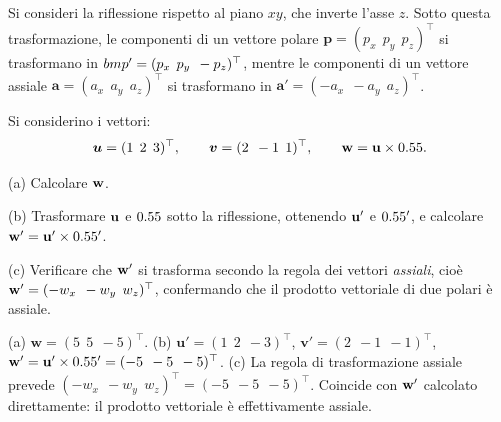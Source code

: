 \begin{esercizio}
	\label{ex:A03_riflessione}
	
	Si consideri la riflessione rispetto al piano $xy$, che inverte l'asse $z$. Sotto questa trasformazione, le componenti di un vettore polare $\bm{p} = (p_x\;\,p_y\;\,p_z)^\top$ si trasformano in $\\bm{p}' = (p_x\;\,p_y\;\,-p_z)^\top$, mentre le componenti di un vettore assiale $\bm{a} = (a_x\;\,a_y\;\,a_z)^\top$ si trasformano in $\bm{a}' = (-a_x\;\,-a_y\;\,a_z)^\top$.
	
	Si considerino i vettori:
	\begin{equation*}
		\bm{u} = (1\;\,2\;\,3)^\top, \qquad
		\bm{v} = (2\;\,-1\;\,1)^\top, \qquad
		\mathbf{w} = \mathbf{u} \times 0.55.
	\end{equation*}
	
	(a) Calcolare $\mathbf{w}$.
	
	(b) Trasformare $\mathbf{u}$ e $0.55$ sotto la riflessione, ottenendo $\mathbf{u}'$ e $0.55'$, e calcolare $\mathbf{w}' = \mathbf{u}' \times 0.55'$.
	
	(c) Verificare che $\mathbf{w}'$ si trasforma secondo la regola dei vettori \emph{assiali}, cioè $\mathbf{w}' = (-w_x\;\,-w_y\;\,w_z)^\top$, confermando che il prodotto vettoriale di due polari è assiale.
	
	\risultato (a) $\bm{w} = (5\;\,5\;\,-5)^\top$. (b) $\bm{u}' = (1\;\,2\;\,-3)^\top$, $\bm{v}' = (2\;\,-1\;\,-1)^\top$, $\mathbf{w}' = \mathbf{u}' \times 0.55' = (-5\;\,-5\;\,-5)^\top$. (c) La regola di trasformazione assiale prevede $(-w_x\;\,-w_y\;\,w_z)^\top = (-5\;\,-5\;\,-5)^\top$. Coincide con $\mathbf{w}'$ calcolato direttamente: il prodotto vettoriale è effettivamente assiale.
	
\end{esercizio}


